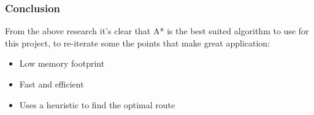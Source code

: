 \subsubsection{Conclusion}
From the above research it's clear that A* is the best suited algorithm to use for this project, to re-iterate some the points that make great application: 
\begin{itemize}
	\item Low memory footprint
	\item Fast and efficient
	\item Uses a heuristic to find the optimal route
\end{itemize}
